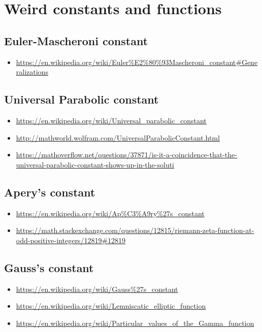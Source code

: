 \section{Weird constants and functions}

\subsection{Euler-Mascheroni constant}
\begin{itemize}
\item \url{https://en.wikipedia.org/wiki/Euler\%E2\%80\%93Mascheroni_constant#Generalizations}
\end{itemize}

\subsection{Universal Parabolic constant}
\begin{itemize}
\item \url{https://en.wikipedia.org/wiki/Universal_parabolic_constant}
\item \url{http://mathworld.wolfram.com/UniversalParabolicConstant.html}
\item \url{https://mathoverflow.net/questions/37871/is-it-a-coincidence-that-the-universal-parabolic-constant-shows-up-in-the-soluti}
\end{itemize}

\subsection{Apery's constant}
\begin{itemize}
\item \url{https://en.wikipedia.org/wiki/Ap%C3%A9ry%27s_constant}
\item \url{https://math.stackexchange.com/questions/12815/riemann-zeta-function-at-odd-positive-integers/12819#12819}
\end{itemize}

\subsection{Gauss's constant}
\begin{itemize}
\item \url{https://en.wikipedia.org/wiki/Gauss\%27s_constant}
\item \url{https://en.wikipedia.org/wiki/Lemniscatic_elliptic_function}
\item \url{https://en.wikipedia.org/wiki/Particular_values_of_the_Gamma_function}
\end{itemize}

